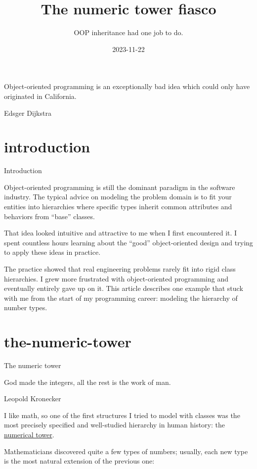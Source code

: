 \documentclass{article}
\title{The numeric tower fiasco}
\subtitle{OOP inheritance had one job to do.}
\date{2023-11-22}
\begin{document}
\epigraph{Object-oriented programming is an exceptionally bad idea which could only have originated in California.}{Edsger Dijkstra}

\section{introduction}{Introduction}

Object-oriented programming is still the dominant paradigm in the software industry.
The typical advice on modeling the problem domain is to fit your entities into hierarchies where specific types inherit common attributes and behaviors from ``base'' classes.

That idea looked intuitive and attractive to me when I first encountered it.
I spent countless hours learning about the ``good'' object-oriented design and trying to apply these ideas in practice.

The practice showed that real engineering problems rarely fit into rigid class hierarchies.
I grew more frustrated with object-oriented programming and eventually entirely gave up on it.
This article describes one example that stuck with me from the start of my programming career: modeling the hierarchy of number types.

\section{the-numeric-tower}{The numeric tower}

\epigraph{God made the integers, all the rest is the work of man.}{Leopold Kronecker}

I like math, so one of the first structures I tried to model with classes was the most precisely specified and well-studied hierarchy in human history: the \href{https://en.wikipedia.org/wiki/Numerical_tower}{numerical tower}.

Mathematicians discovered quite a few types of numbers; usually, each new type is the most natural extension of the previous one:
\end{document}
